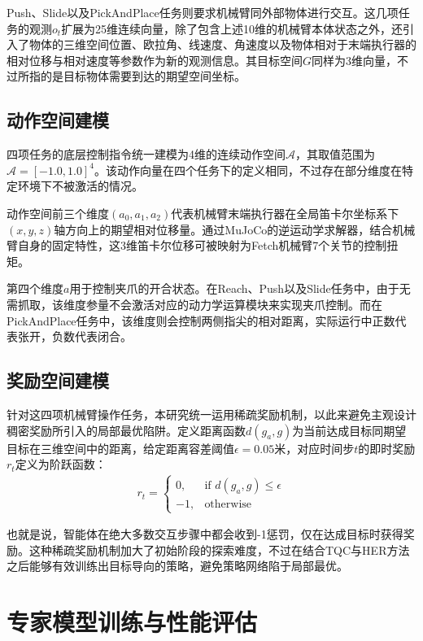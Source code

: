 Push、Slide以及PickAndPlace任务则要求机械臂同外部物体进行交互。这几项任务的观测$o_t$扩展为25维连续向量，除了包含上述10维的机械臂本体状态之外，还引入了物体的三维空间位置、欧拉角、线速度、角速度以及物体相对于末端执行器的相对位移与相对速度等参数作为新的观测信息。其目标空间$G$同样为3维向量，不过所指的是目标物体需要到达的期望空间坐标。

\subsection{动作空间建模}\label{sec:action-space}
四项任务的底层控制指令统一建模为4维的连续动作空间$\mathcal{A}$，其取值范围为$\mathcal{A} = [-1.0, 1.0]^4$。该动作向量在四个任务下的定义相同，不过存在部分维度在特定环境下不被激活的情况。

动作空间前三个维度$(a_0, a_1, a_2)$代表机械臂末端执行器在全局笛卡尔坐标系下$(x, y, z)$轴方向上的期望相对位移量。通过MuJoCo的逆运动学求解器，结合机械臂自身的固定特性，这3维笛卡尔位移可被映射为Fetch机械臂7个关节的控制扭矩。

第四个维度$a$用于控制夹爪的开合状态。在Reach、Push以及Slide任务中，由于无需抓取，该维度参量不会激活对应的动力学运算模块来实现夹爪控制。而在PickAndPlace任务中，该维度则会控制两侧指尖的相对距离，实际运行中正数代表张开，负数代表闭合。

\subsection{奖励空间建模}\label{sec:reward-space}
针对这四项机械臂操作任务，本研究统一运用稀疏奖励机制，以此来避免主观设计稠密奖励所引入的局部最优陷阱。定义距离函数$d(g_a, g)$为当前达成目标同期望目标在三维空间中的距离，给定距离容差阈值$\epsilon=0.05$米，对应时间步$t$的即时奖励$r_t$定义为阶跃函数：
\begin{align}
    r_t = 
    \begin{cases}
        0, & \text{if } d(g_a, g) \leq \epsilon \\
        -1, & \text{otherwise}
    \end{cases}
\end{align}

也就是说，智能体在绝大多数交互步骤中都会收到-1惩罚，仅在达成目标时获得奖励。这种稀疏奖励机制加大了初始阶段的探索难度，不过在结合TQC与HER方法之后能够有效训练出目标导向的策略，避免策略网络陷于局部最优。

\section{专家模型训练与性能评估}\label{sec:expert-training}
